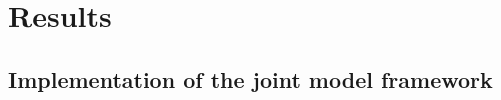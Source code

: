 \documentclass[a4,12pt]{article}
\begin{document}


\section{Results}


    \subsection{Implementation of the joint model framework}

\end{document}
